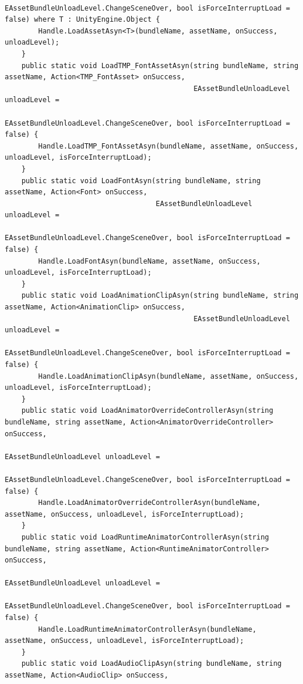 \documentclass[9pt, b5paper]{article}
\begin{document}
\begin{verbatim}
                                        EAssetBundleUnloadLevel.ChangeSceneOver, bool isForceInterruptLoad = false) where T : UnityEngine.Object {
        Handle.LoadAssetAsyn<T>(bundleName, assetName, onSuccess, unloadLevel);
    }
    public static void LoadTMP_FontAssetAsyn(string bundleName, string assetName, Action<TMP_FontAsset> onSuccess, 
                                             EAssetBundleUnloadLevel unloadLevel = 
                                             EAssetBundleUnloadLevel.ChangeSceneOver, bool isForceInterruptLoad = false) {
        Handle.LoadTMP_FontAssetAsyn(bundleName, assetName, onSuccess, unloadLevel, isForceInterruptLoad);
    }
    public static void LoadFontAsyn(string bundleName, string assetName, Action<Font> onSuccess, 
                                    EAssetBundleUnloadLevel unloadLevel = 
                                    EAssetBundleUnloadLevel.ChangeSceneOver, bool isForceInterruptLoad = false) {
        Handle.LoadFontAsyn(bundleName, assetName, onSuccess, unloadLevel, isForceInterruptLoad);
    }
    public static void LoadAnimationClipAsyn(string bundleName, string assetName, Action<AnimationClip> onSuccess, 
                                             EAssetBundleUnloadLevel unloadLevel = 
                                             EAssetBundleUnloadLevel.ChangeSceneOver, bool isForceInterruptLoad = false) {
        Handle.LoadAnimationClipAsyn(bundleName, assetName, onSuccess, unloadLevel, isForceInterruptLoad);
    }
    public static void LoadAnimatorOverrideControllerAsyn(string bundleName, string assetName, Action<AnimatorOverrideController> onSuccess, 
                                                          EAssetBundleUnloadLevel unloadLevel = 
                                                          EAssetBundleUnloadLevel.ChangeSceneOver, bool isForceInterruptLoad = false) {
        Handle.LoadAnimatorOverrideControllerAsyn(bundleName, assetName, onSuccess, unloadLevel, isForceInterruptLoad);
    }
    public static void LoadRuntimeAnimatorControllerAsyn(string bundleName, string assetName, Action<RuntimeAnimatorController> onSuccess, 
                                                         EAssetBundleUnloadLevel unloadLevel = 
                                                         EAssetBundleUnloadLevel.ChangeSceneOver, bool isForceInterruptLoad = false) {
        Handle.LoadRuntimeAnimatorControllerAsyn(bundleName, assetName, onSuccess, unloadLevel, isForceInterruptLoad);
    }
    public static void LoadAudioClipAsyn(string bundleName, string assetName, Action<AudioClip> onSuccess, 

\end{verbatim}
\end{document}
